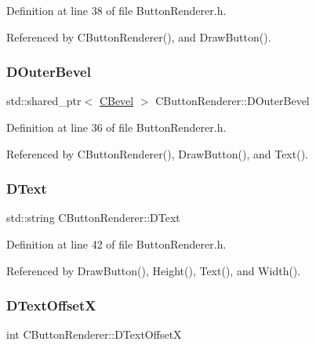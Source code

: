 Definition at line 38 of file Button\+Renderer.\+h.



Referenced by C\+Button\+Renderer(), and Draw\+Button().

\hypertarget{classCButtonRenderer_a6b0a352b22395934e0483569d2757a48}{}\label{classCButtonRenderer_a6b0a352b22395934e0483569d2757a48} 
\subsubsection{\texorpdfstring{D\+Outer\+Bevel}{DOuterBevel}}
{\footnotesize\ttfamily std\+::shared\+\_\+ptr$<$ \hyperlink{classCBevel}{C\+Bevel} $>$ C\+Button\+Renderer\+::\+D\+Outer\+Bevel\hspace{0.3cm}{\ttfamily [protected]}}



Definition at line 36 of file Button\+Renderer.\+h.



Referenced by C\+Button\+Renderer(), Draw\+Button(), and Text().

\hypertarget{classCButtonRenderer_a8f058166dec8d1c73adc009e4c436092}{}\label{classCButtonRenderer_a8f058166dec8d1c73adc009e4c436092} 
\subsubsection{\texorpdfstring{D\+Text}{DText}}
{\footnotesize\ttfamily std\+::string C\+Button\+Renderer\+::\+D\+Text\hspace{0.3cm}{\ttfamily [protected]}}



Definition at line 42 of file Button\+Renderer.\+h.



Referenced by Draw\+Button(), Height(), Text(), and Width().

\hypertarget{classCButtonRenderer_aaeb649ff53e0032e756c53b2f51f3d96}{}\label{classCButtonRenderer_aaeb649ff53e0032e756c53b2f51f3d96} 
\subsubsection{\texorpdfstring{D\+Text\+OffsetX}{DTextOffsetX}}
{\footnotesize\ttfamily int C\+Button\+Renderer\+::\+D\+Text\+OffsetX\hspace{0.3cm}{\ttfamily [protected]}}



